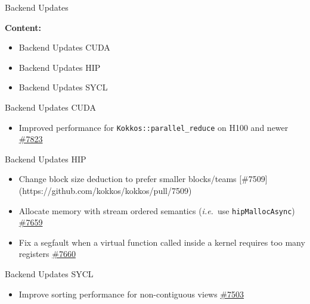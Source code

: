 
\begin{frame}[fragile]

  {\Huge Backend Updates}

  \vspace{10pt}

  \textbf{Content:}
  \begin{itemize}
    \item Backend Updates CUDA
    \item Backend Updates HIP
    \item Backend Updates SYCL
  \end{itemize}

\end{frame}





\begin{frame}[fragile]{Backend Updates CUDA}
  \begin{itemize}
      \item Improved performance for \texttt{Kokkos::parallel\_reduce} on H100 and newer \hyperlink{https://github.com/kokkos/kokkos/pull/7823}{\#7823}
  \end{itemize}
\end{frame}

\begin{frame}[fragile]{Backend Updates HIP}
  \begin{itemize}
      \item Change block size deduction to prefer smaller blocks/teams [\#7509](https://github.com/kokkos/kokkos/pull/7509)
      \item Allocate memory with stream ordered semantics (\emph{i.e.}\ use \texttt{hipMallocAsync}) \hyperlink{https://github.com/kokkos/kokkos/pull/7659}{\#7659}
      \item Fix a segfault when a virtual function called inside a kernel requires too many registers \hyperlink{https://github.com/kokkos/kokkos/pull/7660}{\#7660}
  \end{itemize}
\end{frame}


\begin{frame}[fragile]{Backend Updates SYCL}
  \begin{itemize}
      \item Improve sorting performance for non-contiguous views \hyperlink{https://github.com/kokkos/kokkos/pull/7502}{\#7503}
  \end{itemize}
\end{frame}

